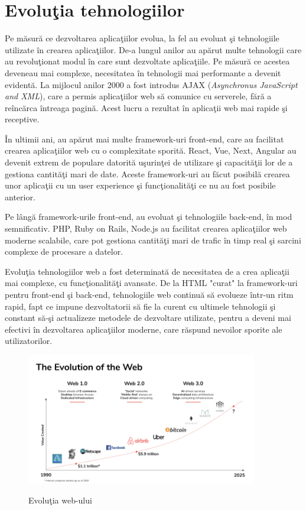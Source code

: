 \documentclass[12pt, a4paper]{report}
\begin{document}
\section{Evolu\c tia tehnologiilor}

Pe m\u asur\u a ce dezvoltarea aplica\c tiilor evolua, la fel au evoluat \c si tehnologiile utilizate \^in crearea aplica\c tiilor. De-a lungul anilor au ap\u arut multe tehnologii care au revolu\c tionat modul \^in care sunt dezvoltate aplica\c tiile. Pe m\u asur\u a ce acestea deveneau mai complexe, necesitatea \^in tehnologii mai performante a devenit evident\u a. La mijlocul anilor 2000 a fost introdus AJAX (\emph{Asynchronus JavaScript and XML}), care a permis aplica\c tiilor web s\u a comunice cu serverele, f\u ar\u a a re\^inc\u arca \^intreaga pagin\u a. Acest lucru a rezultat \^in aplica\c tii web mai rapide \c si receptive. \cite{ajax}

\^In ultimii ani, au ap\u arut mai multe framework-uri front-end, care au facilitat crearea aplica\c tiilor web cu o complexitate sporit\u a. React, Vue, Next, Angular au devenit extrem de populare datorit\u a u\c surin\c tei de utilizare \c si capacit\u a\c tii lor de a gestiona cantit\u a\c ti mari de date. Aceste framework-uri au f\u acut posibil\u a crearea unor aplica\c tii cu un user experience \c si func\c tionalit\u a\c ti ce nu au fost posibile anterior.

Pe l\^ang\u a framework-urile front-end, au evoluat \c si tehnologiile back-end, \^in mod semnificativ. PHP, Ruby on Rails, Node.js au facilitat crearea aplica\c tiilor web moderne scalabile, care pot gestiona cantit\u a\c ti mari de trafic \^in timp real \c si sarcini complexe de procesare a datelor.

Evolu\c tia tehnologiilor web a fost determinat\u a de necesitatea de a crea aplica\c tii mai complexe, cu func\c tionalit\u a\c ti avansate. De la HTML "curat" la framework-uri pentru front-end \c si back-end, tehnologiile web continu\u a s\u a evolueze \^intr-un ritm rapid, fapt ce impune dezvoltatorii s\u a fie la curent cu ultimele tehnologii \c si constant s\u a-\c si actualizeze metodele de dezvoltare utilizate, pentru a deveni mai efectivi \^in dezvoltarea aplica\c tiilor moderne, care r\u aspund nevoilor sporite ale utilizatorilor.

\begin{figure}[htbp]
	\centering
	\includegraphics[width=0.9\textwidth]{web-evolution.png} \label{fig:web-evolution}
	\caption{Evolu\c tia web-ului \protect\footnotemark}
\end{figure}
\end{document}
